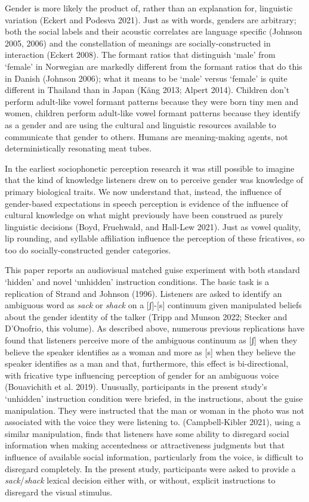 \documentclass[
  letterpaper,
  DIV=11,
  numbers=noendperiod]{scrartcl}
\begin{document}
Gender is more likely the product of, rather than an explanation for,
linguistic variation (Eckert and Podesva 2021). Just as with words,
genders are arbitrary; both the social labels and their acoustic
correlates are language specific (Johnson 2005, 2006) and the
constellation of meanings are socially-constructed in interaction
(Eckert 2008). The formant ratios that distinguish `male' from `female'
in Norwegian are markedly different from the formant ratios that do this
in Danish (Johnson 2006); what it means to be `male' versus `female' is
quite different in Thailand than in Japan (Käng 2013; Alpert 2014).
Children don't perform adult-like vowel formant patterns because they
were born tiny men and women, children perform adult-like vowel formant
patterns because they identify as a gender and are using the cultural
and linguistic resources available to communicate that gender to others.
Humans are meaning-making agents, not deterministically resonating meat
tubes.

In the earliest sociophonetic perception research it was still possible
to imagine that the kind of knowledge listeners drew on to perceive
gender was knowledge of primary biological traits. We now understand
that, instead, the influence of gender-based expectations in speech
perception is evidence of the influence of cultural knowledge on what
might previously have been construed as purely linguistic decisions
(Boyd, Fruehwald, and Hall-Lew 2021). Just as vowel quality, lip
rounding, and syllable affiliation influence the perception of these
fricatives, so too do socially-constructed gender categories.

This paper reports an audiovisual matched guise experiment with both
standard `hidden' and novel `unhidden' instruction conditions. The basic
task is a replication of Strand and Johnson (1996). Listeners are asked
to identify an ambiguous word as \emph{sack} or \emph{shack} on a
{[}ʃ{]}-{[}s{]} continuum given manipulated beliefs about the gender
identity of the talker (Tripp and Munson 2022; Stecker and D'Onofrio,
this volume). As described above, numerous previous replications have
found that listeners perceive more of the ambiguous continuum as {[}ʃ{]}
when they believe the speaker identifies as a woman and more as {[}s{]}
when they believe the speaker identifies as a man and that, furthermore,
this effect is bi-directional, with fricative type influencing
perception of gender for an ambiguous voice (Bouavichith et al. 2019).
Unusually, participants in the present study's `unhidden' instruction
condition were briefed, in the instructions, about the guise
manipulation. They were instructed that the man or woman in the photo
was not associated with the voice they were listening to.
(Campbell-Kibler 2021), using a similar manipulation, finds that
listeners have some ability to disregard social information when making
accentedness or attractiveness judgments but that influence of available
social information, particularly from the voice, is difficult to
disregard completely. In the present study, participants were asked to
provide a \emph{sack}/\emph{shack} lexical decision either with, or
without, explicit instructions to disregard the visual stimulus.
\end{document}
